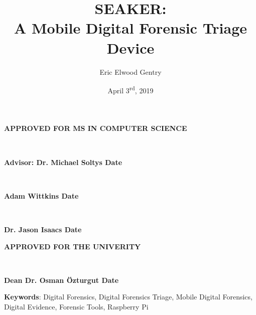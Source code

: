 \documentclass[12pt]{article}
\newcommand{\A}{\mathcal{A}}
\begin{document}
\begin{center}
{\large \bfseries APPROVED FOR MS IN COMPUTER SCIENCE \par}

\vspace{1.5 cm}

\hrulefill\\
{\large \bfseries Advisor: Dr. Michael Soltys \hfill Date \par}

\vspace{1.5 cm}

\hrulefill\\
{\large \bfseries Adam Wittkins \hfill Date \par}

\vspace{1.5 cm}

\hrulefill\\
{\large \bfseries Dr. Jason Isaacs \hfill Date \par}

\vspace{3 cm}

{\large \bfseries APPROVED FOR THE UNIVERITY \par}

\vspace{1.5 cm}

\hrulefill\\
{\large \bfseries Dean Dr. Osman \"{O}zturgut \hfill Date \par}
\end{center}

\newpage



\newpage 

\title{SEAKER:\protect\\A Mobile Digital Forensic Triage Device}
\author{Eric Elwood Gentry}

\date{April 3\textsuperscript{rd}, 2019}
\maketitle

\small{\textbf{Keywords}: Digital Forensics, Digital Forensics Triage, Mobile Digital Forensics,
Digital Evidence, Forensic Tools, Raspberry Pi}
\\
\end{document}

